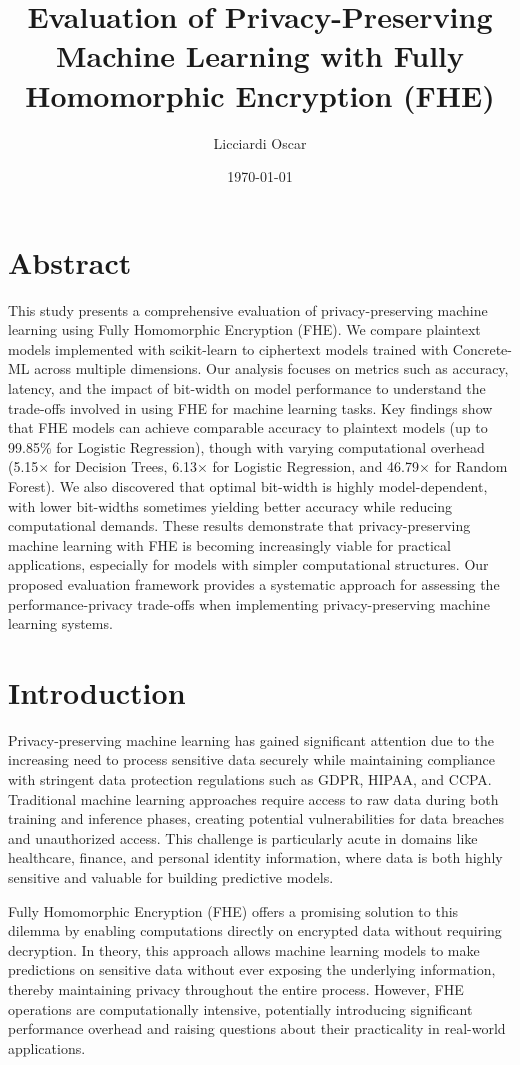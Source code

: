 \documentclass[a4paper,12pt]{article}
\title{Evaluation of Privacy-Preserving Machine Learning with Fully Homomorphic Encryption (FHE)}
\author{ Licciardi Oscar}
\date{\today}
\begin{document}
\maketitle

\section*{Abstract}
This study presents a comprehensive evaluation of privacy-preserving machine learning using Fully Homomorphic Encryption (FHE). We compare plaintext models implemented with scikit-learn to ciphertext models trained with Concrete-ML across multiple dimensions. Our analysis focuses on metrics such as accuracy, latency, and the impact of bit-width on model performance to understand the trade-offs involved in using FHE for machine learning tasks. Key findings show that FHE models can achieve comparable accuracy to plaintext models (up to 99.85\% for Logistic Regression), though with varying computational overhead (5.15× for Decision Trees, 6.13× for Logistic Regression, and 46.79× for Random Forest). We also discovered that optimal bit-width is highly model-dependent, with lower bit-widths sometimes yielding better accuracy while reducing computational demands. These results demonstrate that privacy-preserving machine learning with FHE is becoming increasingly viable for practical applications, especially for models with simpler computational structures. Our proposed evaluation framework provides a systematic approach for assessing the performance-privacy trade-offs when implementing privacy-preserving machine learning systems.

\section{Introduction}
Privacy-preserving machine learning has gained significant attention due to the increasing need to process sensitive data securely while maintaining compliance with stringent data protection regulations such as GDPR, HIPAA, and CCPA. Traditional machine learning approaches require access to raw data during both training and inference phases, creating potential vulnerabilities for data breaches and unauthorized access. This challenge is particularly acute in domains like healthcare, finance, and personal identity information, where data is both highly sensitive and valuable for building predictive models.

Fully Homomorphic Encryption (FHE) offers a promising solution to this dilemma by enabling computations directly on encrypted data without requiring decryption. In theory, this approach allows machine learning models to make predictions on sensitive data without ever exposing the underlying information, thereby maintaining privacy throughout the entire process. However, FHE operations are computationally intensive, potentially introducing significant performance overhead and raising questions about their practicality in real-world applications.
\end{document}
